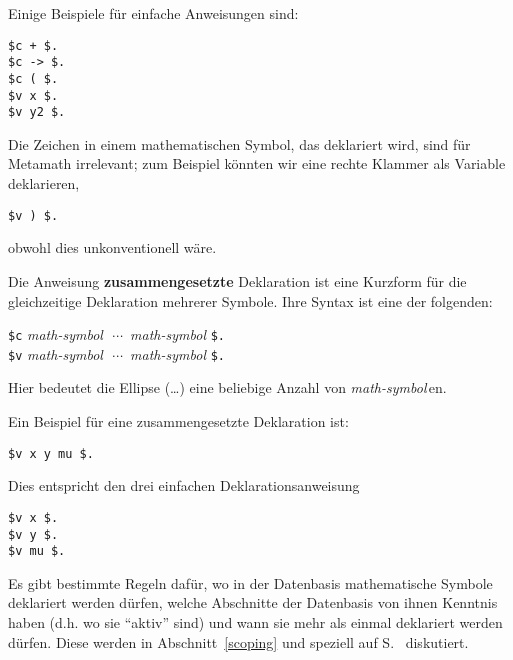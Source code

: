 Einige Beispiele für einfache Anweisungen sind:
\begin{center}
  \texttt{\$c + \$.}\\
  \texttt{\$c -> \$.}\\
  \texttt{\$c ( \$.}\\
  \texttt{\$v x \$.}\\
  \texttt{\$v y2 \$.}
\end{center}

Die Zeichen in einem mathematischen Symbol, das deklariert wird, sind für Meta\-math irrelevant; zum Beispiel könnten wir eine rechte Klammer als Variable deklarieren,
\begin{center}
  \texttt{\$v ) \$.}\\
\end{center}
obwohl dies unkonventionell wäre.

Die Anweisung {\bf zusammengesetzte} Deklaration ist eine Kurzform für die gleichzeitige Deklaration mehrerer Symbole.  Ihre Syntax ist eine der folgenden:
\begin{center}
  \texttt{\$c} {\em math-symbol}\ \,$\cdots$\ {\em math-symbol} \texttt{\$.}\\
  \texttt{\$v} {\em math-symbol}\ \,$\cdots$\ {\em math-symbol} \texttt{\$.}
\end{center}
Hier bedeutet die Ellipse (\ldots) eine beliebige Anzahl von {\em math-symbol}\,en.

Ein Beispiel für eine zusammengesetzte Deklaration ist:
\begin{center}
  \texttt{\$v x y mu \$.}\\
\end{center}
Dies entspricht den drei einfachen Deklarationsanweisung
\begin{center}
  \texttt{\$v x \$.}\\
  \texttt{\$v y \$.}\\
  \texttt{\$v mu \$.}\\
\end{center}

Es gibt bestimmte Regeln dafür, wo in der Datenbasis mathematische Symbole deklariert werden dürfen, welche Abschnitte der Datenbasis von ihnen Kenntnis haben (d.h. wo sie "`aktiv"' sind) und wann sie mehr als einmal deklariert werden dürfen.  Diese werden in Abschnitt~\ref{scoping} und speziell auf S.~\pageref{redeclaration} diskutiert.

